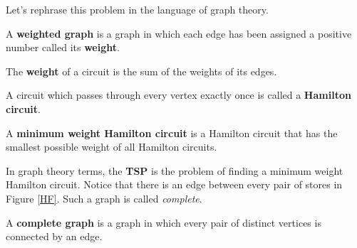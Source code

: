 Let's rephrase this problem in the language of graph theory.

\begin{dfn}
A \textbf{weighted graph} is a graph in which each edge has been assigned a positive number called its \textbf{weight}.
\end{dfn}

\begin{dfn}
The \textbf{weight} of a circuit is the sum of the weights of its edges.
\end{dfn}

\begin{dfn}
A circuit which passes through every vertex exactly once is called a \textbf{Hamilton circuit}.
\end{dfn}

\begin{dfn}
A \textbf{minimum weight Hamilton circuit} is a Hamilton circuit that has the smallest possible weight of all Hamilton circuits.
\end{dfn}

In graph theory terms, the \textbf{TSP} is the problem of finding a minimum weight Hamilton circuit.   Notice that there is an edge between every pair of stores in Figure \ref{HF}.  Such a graph is called \emph{complete}.

\begin{dfn}
A \textbf{complete graph} is a graph in which every pair of distinct vertices is connected by an edge.
\end{dfn}

